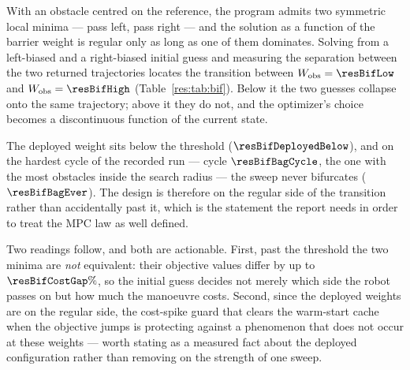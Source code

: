 \begin{table}[htbp]
  \centering
  \small
  \caption{Effect of the tightening on the predicted trajectory.}
  \label{res:tab:robust}
\end{table}

\label{res:bif}


With an obstacle centred on the reference, the program admits two symmetric local minima --- pass left, pass right --- and the solution as a function of the barrier weight is regular only as long as one of them dominates. Solving from a left-biased and a right-biased initial guess and measuring the separation between the two returned trajectories locates the transition between $\Wobs=\resBifLow$ and $\Wobs=\resBifHigh$ (Table~\ref{res:tab:bif}). Below it the two guesses collapse onto the same trajectory; above it they do not, and the optimizer's choice becomes a discontinuous function of the current state.

The deployed weight sits below the threshold ($\resBifDeployedBelow$), and on the hardest cycle of the recorded run --- cycle $\resBifBagCycle$, the one with the most obstacles inside the search radius --- the sweep never bifurcates ($\resBifBagEver$). The design is therefore on the regular side of the transition rather than accidentally past it, which is the statement the report needs in order to treat the MPC law as well defined.

Two readings follow, and both are actionable. First, past the threshold the two minima are \emph{not} equivalent: their objective values differ by up to $\resBifCostGap\%$, so the initial guess decides not merely which side the robot passes on but how much the manoeuvre costs. Second, since the deployed weights are on the regular side, the cost-spike guard that clears the warm-start cache when the objective jumps is protecting against a phenomenon that does not occur at these weights --- worth stating as a measured fact about the deployed configuration rather than removing on the strength of one sweep.

\begin{table}[htbp]
  \centering
  \small
  \caption{Left-biased against right-biased solve of the same instance, against the barrier weight. The separation is the distance between the two returned trajectories: a value at solver tolerance means the two guesses converged to the same minimum.}
  \label{res:tab:bif}
\end{table}

